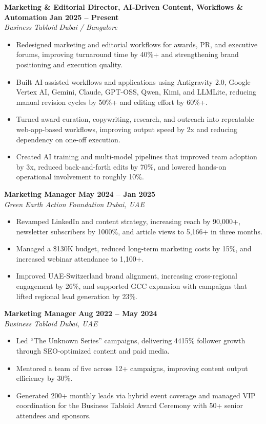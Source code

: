 \documentclass[10pt,a4paper]{article}
\begin{document}
\noindent\textbf{Marketing \& Editorial Director, AI-Driven Content, Workflows \& Automation} \hfill \textbf{Jan 2025 -- Present}\\
\textit{Business Tabloid} \hfill \textit{Dubai / Bangalore}
\begin{itemize}[leftmargin=*,nosep,topsep=2pt]
  \item Redesigned marketing and editorial workflows for awards, PR, and executive forums, improving turnaround time by 40\%+ and strengthening brand positioning and execution quality.
  \item Built AI-assisted workflows and applications using Antigravity 2.0, Google Vertex AI, Gemini, Claude, GPT-OSS, Qwen, Kimi, and LLMLite, reducing manual revision cycles by 50\%+ and editing effort by 60\%+.
  \item Turned award curation, copywriting, research, and outreach into repeatable web-app-based workflows, improving output speed by 2x and reducing dependency on one-off execution.
  \item Created AI training and multi-model pipelines that improved team adoption by 3x, reduced back-and-forth edits by 70\%, and lowered hands-on operational involvement to roughly 10\%.
\end{itemize}
\vspace{3pt}

\noindent\textbf{Marketing Manager} \hfill \textbf{May 2024 -- Jan 2025}\\
\textit{Green Earth Action Foundation} \hfill \textit{Dubai, UAE}
\begin{itemize}[leftmargin=*,nosep,topsep=2pt]
  \item Revamped LinkedIn and content strategy, increasing reach by 90,000+, newsletter subscribers by 1000\%, and article views to 5,166+ in three months.
  \item Managed a \$130K budget, reduced long-term marketing costs by 15\%, and increased webinar attendance to 1,100+.
  \item Improved UAE-Switzerland brand alignment, increasing cross-regional engagement by 26\%, and supported GCC expansion with campaigns that lifted regional lead generation by 23\%.
\end{itemize}
\vspace{3pt}

\noindent\textbf{Marketing Manager} \hfill \textbf{Aug 2022 -- May 2024}\\
\textit{Business Tabloid} \hfill \textit{Dubai, UAE}
\begin{itemize}[leftmargin=*,nosep,topsep=2pt]
  \item Led ``The Unknown Series'' campaigns, delivering 4415\% follower growth through SEO-optimized content and paid media.
  \item Mentored a team of five across 12+ campaigns, improving content output efficiency by 30\%.
  \item Generated 200+ monthly leads via hybrid event coverage and managed VIP coordination for the Business Tabloid Award Ceremony with 50+ senior attendees and sponsors.
\end{itemize}
\vspace{3pt}
\end{document}
